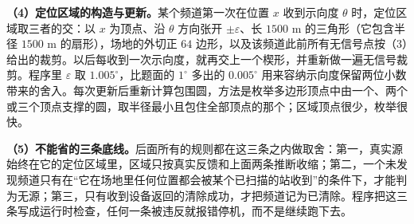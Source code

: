 \begin{center}
\begin{minipage}{\linewidth}
\centering
\QThreeNegativeFigure
{}
\label{fig:q3-negative}
\end{minipage}
\end{center}

\textbf{（4）定位区域的构造与更新。}某个频道第一次在位置 $x$ 收到示向度 $\theta$ 时，定位区域取三者的交：以 $x$ 为顶点、沿 $\theta$ 方向张开 $\pm\varepsilon$、长 $1500$ m 的三角形（它包含半径 $1500$ m 的扇形），场地的外切正 $64$ 边形，以及该频道此前所有无信号点按（3）给出的裁剪。以后每收到一次示向度，就再交上一个楔形，并重新做一遍无信号裁剪。程序里 $\varepsilon$ 取 $1.005^\circ$，比题面的 $1^\circ$ 多出的 $0.005^\circ$ 用来容纳示向度保留两位小数带来的舍入。每次更新后重新计算包围圆，方法是枚举多边形顶点中由一个、两个或三个顶点支撑的圆，取半径最小且包住全部顶点的那个；区域顶点很少，枚举很快。

\textbf{（5）不能省的三条底线。}后面所有的规则都在这三条之内做取舍：第一，真实源始终在它的定位区域里，区域只按真实反馈和上面两条推断收缩；第二，一个未发现频道只有在“它在场地里任何位置都会被某个已扫描的站收到”的条件下，才能判为无源；第三，只有收到设备返回的清除成功，才把频道记为已清除。程序把这三条写成运行时检查，任何一条被违反就报错停机，而不是继续跑下去。
